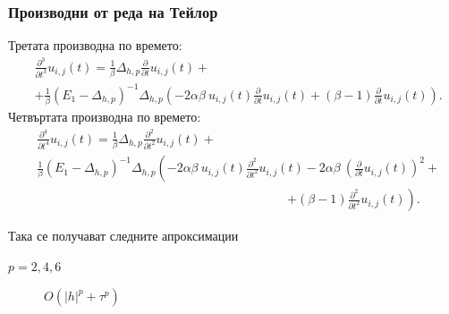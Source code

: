 \documentclass{beamer}
\begin{document}

\begin{frame}
\frametitle{Производни от реда на Тейлор}
Третата производна по времето:
\begin{align*}
 &\frac{\partial^3}{\partial t^3}u_{i,j}(t) = \frac{1}{\beta}\Delta_{h,p} \frac{\partial}{\partial t}u_{i, j}(t) + \nonumber\\
&+ \frac{1}{\beta} (E_1-\Delta_{h,p})^{-1}\Delta_{h,p} \left( -2 \alpha \beta \: u_{i, j}(t) \frac{\partial}{\partial t}u_{i, j}(t) +  (\beta-1) \frac{\partial}{\partial t} u_{i, j}(t) \right).
\end{align*}
Четвъртата производна по времето:
\begin{align*} 
&\frac{\partial^4}{\partial t^4}u_{i,j}(t) = \frac{1}{\beta}\Delta_{h,p} \frac{\partial^2}{\partial t^2}u_{i, j}(t) +   \nonumber\\
& \frac{1}{\beta}(E_1-\Delta_{h,p})^{-1}\Delta_{h,p} \left( -2 \alpha \beta \:  u_{i, j}(t)\frac{\partial^2}{\partial t^2}u_{i, j}(t) -2 \alpha \beta \: \left( \frac{\partial}{\partial t}u_{i, j}(t) \right)^2 + \right. \nonumber\\
&\quad \quad \quad \quad \quad \quad \quad \quad \quad \quad \quad \quad \quad \quad \quad \quad \quad \quad \quad \quad \left. +  (\beta-1) \frac{\partial^2}{\partial t^2} u_{i, j}(t) \right) .
\end{align*}

Така се получават следните апроксимации
\begin{description}
 \item[$p=2,4,6$] $O(|h|^p + \tau^p)$
\end{description}

\end{frame}
\end{document}

